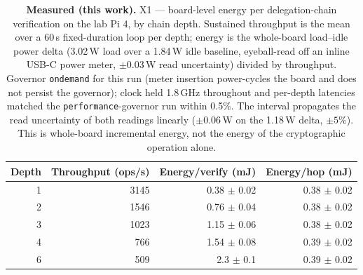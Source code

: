 \begin{table}[htbp]
\centering
\caption{\textbf{Measured (this work).} X1 --- board-level energy per delegation-chain verification on the lab Pi 4, by chain depth. Sustained throughput is the mean over a 60\,s fixed-duration loop per depth; energy is the whole-board load--idle power delta (3.02\,W load over a 1.84\,W idle baseline, eyeball-read off an inline USB-C power meter, $\pm0.03$\,W read uncertainty) divided by throughput. Governor \texttt{ondemand} for this run (meter insertion power-cycles the board and does not persist the governor); clock held 1.8\,GHz throughout and per-depth latencies matched the \texttt{performance}-governor run within 0.5\%. The interval propagates the read uncertainty of both readings linearly ($\pm0.06$\,W on the 1.18\,W delta, $\pm5\%$). This is whole-board incremental energy, not the energy of the cryptographic operation alone.}
\label{tab:bench-energy}
\begin{tabular}{r r r r}
\toprule
Depth & Throughput (ops/s) & Energy/verify (mJ) & Energy/hop (mJ) \\
\midrule
1 & 3145 & 0.38 $\pm$ 0.02 & 0.38 $\pm$ 0.02 \\
2 & 1546 & 0.76 $\pm$ 0.04 & 0.38 $\pm$ 0.02 \\
3 & 1023 & 1.15 $\pm$ 0.06 & 0.38 $\pm$ 0.02 \\
4 & 766 & 1.54 $\pm$ 0.08 & 0.39 $\pm$ 0.02 \\
6 & 509 & 2.3 $\pm$ 0.1 & 0.39 $\pm$ 0.02 \\
\bottomrule
\end{tabular}
\end{table}
